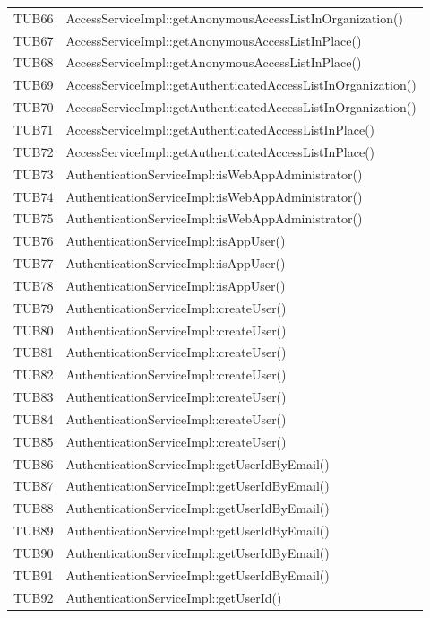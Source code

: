 {\begin{longtable}{C{2cm} C{12cm}}
		TUB66 & AccessServiceImpl::getAnonymousAccessListInOrganization()\\
		TUB67 & AccessServiceImpl::getAnonymousAccessListInPlace()\\
		TUB68 & AccessServiceImpl::getAnonymousAccessListInPlace()\\
		TUB69 & AccessServiceImpl::getAuthenticatedAccessListInOrganization()\\
		TUB70 & AccessServiceImpl::getAuthenticatedAccessListInOrganization()\\
		TUB71 & AccessServiceImpl::getAuthenticatedAccessListInPlace()\\
		TUB72 & AccessServiceImpl::getAuthenticatedAccessListInPlace()\\
		TUB73 & AuthenticationServiceImpl::isWebAppAdministrator()\\
		TUB74 & AuthenticationServiceImpl::isWebAppAdministrator()\\
		TUB75 & AuthenticationServiceImpl::isWebAppAdministrator()\\
		TUB76 & AuthenticationServiceImpl::isAppUser()\\
		TUB77 & AuthenticationServiceImpl::isAppUser()\\
		TUB78 & AuthenticationServiceImpl::isAppUser()\\
		TUB79 & AuthenticationServiceImpl::createUser()\\
		TUB80 & AuthenticationServiceImpl::createUser()\\
		TUB81 & AuthenticationServiceImpl::createUser()\\
		TUB82 & AuthenticationServiceImpl::createUser()\\
		TUB83 & AuthenticationServiceImpl::createUser()\\
		TUB84 & AuthenticationServiceImpl::createUser()\\
		TUB85 & AuthenticationServiceImpl::createUser()\\
		TUB86 & AuthenticationServiceImpl::getUserIdByEmail()\\
		TUB87 & AuthenticationServiceImpl::getUserIdByEmail()\\
		TUB88 & AuthenticationServiceImpl::getUserIdByEmail()\\
		TUB89 & AuthenticationServiceImpl::getUserIdByEmail()\\
		TUB90 & AuthenticationServiceImpl::getUserIdByEmail()\\
		TUB91 & AuthenticationServiceImpl::getUserIdByEmail()\\
		TUB92 & AuthenticationServiceImpl::getUserId()\\

\end{longtable}}
